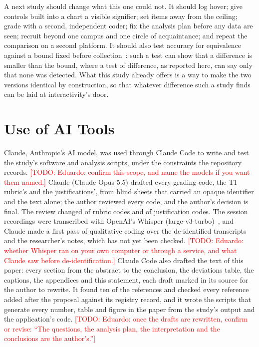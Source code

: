 \documentclass[10pt,twocolumn]{article}
\newcommand{\todo}[1]{\textcolor{red}{[TODO: #1]}}
\begin{document}
A next study should change what this one could not. It should log hover; give controls built into a chart a visible signifier; set items away from the ceiling; grade with a second, independent coder; fix the analysis plan before any data are seen; recruit beyond one campus and one circle of acquaintance; and repeat the comparison on a second platform. It should also test accuracy for equivalence against a bound fixed before collection~\cite{schuirmann1987,lakens2017}: such a test can show that a difference is smaller than the bound, where a test of difference, as reported here, can say only that none was detected. What this study already offers is a way to make the two versions identical by construction, so that whatever difference such a study finds can be laid at interactivity's door.

\section*{Use of AI Tools}

Claude, Anthropic's AI model, was used through Claude Code to write and test the study's software and analysis scripts, under the constraints the repository records. \todo{Eduardo: confirm this scope, and name the models if you want them named.} Claude (Claude Opus 5.5) drafted every grading code, the T1 rubric's and the justifications', from blind sheets that carried an opaque identifier and the text alone; the author reviewed every code, and the author's decision is final. The review changed  of  rubric codes and  of  justification codes. The session recordings were transcribed with OpenAI's Whisper (large-v3-turbo)~\cite{radford2023}, and Claude made a first pass of qualitative coding over the de-identified transcripts and the researcher's notes, which has not yet been checked. \todo{Eduardo: whether Whisper ran on your own computer or through a service, and what Claude saw before de-identification.} Claude Code also drafted the text of this paper: every section from the abstract to the conclusion, the deviations table, the captions, the appendices and this statement, each draft marked in its source for the author to rewrite. It found ten of the references and checked every reference added after the proposal against its registry record, and it wrote the scripts that generate every number, table and figure in the paper from the study's output and the application's code. \todo{Eduardo: once the drafts are rewritten, confirm or revise: ``The questions, the analysis plan, the interpretation and the conclusions are the author's.''}
\end{document}
